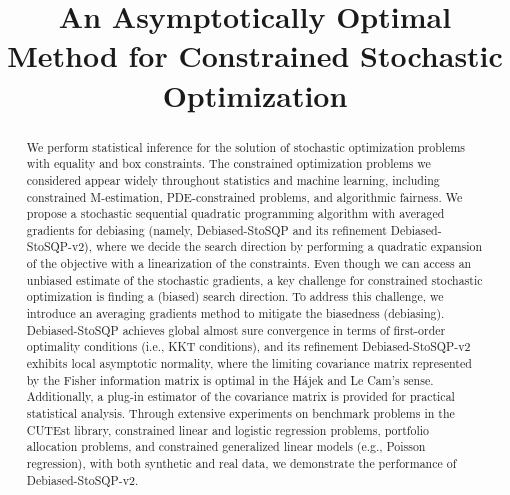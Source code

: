 \documentclass[aos]{imsart}
\numberwithin{equation}{section}
\theoremstyle{plain}
\begin{document}
\begin{frontmatter}

\title{An Asymptotically Optimal Method for Constrained Stochastic Optimization}


\begin{abstract}
We perform statistical inference for the solution of stochastic optimization problems with equality and box constraints. 
The constrained optimization problems we considered appear widely throughout statistics and machine learning, including constrained M-estimation, PDE-constrained problems, and algorithmic fairness. 
We propose a stochastic sequential quadratic programming algorithm with averaged gradients for debiasing (namely, Debiased-StoSQP and its refinement Debiased-StoSQP-v2), where we decide the search direction by performing a quadratic expansion of the objective with a linearization of the constraints.
Even though we can access an unbiased estimate of the stochastic gradients, a key challenge for constrained stochastic optimization is finding a (biased) search direction. 
To address this challenge, we introduce an averaging gradients method to mitigate the biasedness (debiasing). 
Debiased-StoSQP achieves global almost sure convergence in terms of first-order optimality conditions (i.e., KKT conditions), and its refinement Debiased-StoSQP-v2 exhibits local asymptotic normality, where the limiting covariance matrix represented by the Fisher information matrix is optimal in the H\'ajek and Le Cam's sense. 
Additionally, a plug-in estimator of the covariance matrix is provided for practical statistical analysis. 
Through extensive experiments on benchmark problems in the CUTEst library, constrained linear and logistic regression problems, portfolio allocation problems, and constrained generalized linear models (e.g., Poisson regression), with both synthetic and real data, we demonstrate the performance of Debiased-StoSQP-v2.
\end{abstract}



\end{frontmatter}
\end{document}
